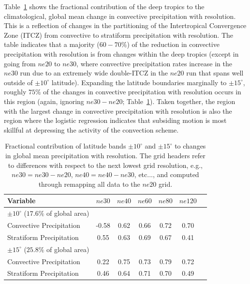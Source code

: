 \documentclass[times]{qjrms4}
\begin{document}
Table~\ref{tbl:table2} shows the fractional contribution of the deep tropics to the climatological, global mean change in convective precipitation with resolution. This is a reflection of changes in the partitioning of the Intertropical Convergence Zone (ITCZ) from convective to stratiform precipitation with resolution. The table indicates that a majority ($60-70 \%$) of the reduction in convective precipitation with resolution is from changes within the deep tropics (except in going from $ne20$ to $ne30$, where convective precipitation rates increase in the $ne30$ run due to an extremely wide double-ITCZ in the $ne20$ run that spans well outside of $\pm 10^{\circ}$ latitude). Expanding the latitude boundaries marginally to $\pm 15^{\circ}$, roughly $75\%$ of the changes in convective precipitation with resolution occurs in this region (again, ignoring $ne30-ne20$; Table~\ref{tbl:table2}). Taken together, the region with the largest change in convective precipitation with resolution is also the region where the logistic regression indicates that subsiding motion is most skillful at depressing the activity of the convection scheme.

 \begin{table}
 \caption{Fractional contribution of latitude bands $\pm 10^{\circ}$ and $\pm 15^{\circ}$ to changes in global mean precipitation with resolution. The grid headers refer to differences with respect to the next lowest grid resolution, e.g., $ne30 = ne30-ne20$, $ne40=ne40-ne30$, etc..., and computed through remapping all data to the $ne20$ grid.}
 \centering
 \scriptsize
 \begin{tabular}{lcccccc}
   \hline
   Variable & $ne30$ & $ne40$ & $ne60$ & $ne80$ & $ne120$ \\ 
   \hline
   $\pm 10^{\circ}$ ($17.6\%$ of global area) \\
   Convective Precipitation & -0.58 & 0.62 & 0.66 & 0.72 & 0.70 \\
   Stratiform Precipitation & 0.55 & 0.63 & 0.69 & 0.67 & 0.41 \\ 
   \hline
   $\pm 15^{\circ}$ ($25.8\%$ of global area) \\
   Convective Precipitation & 0.22 & 0.75 & 0.73 & 0.79 & 0.72 \\
   Stratiform Precipitation & 0.46 & 0.64 & 0.71 & 0.70 & 0.49 \\      
 \hline
 \end{tabular}
 \label{tbl:table2}
 \end{table}
\end{document}
